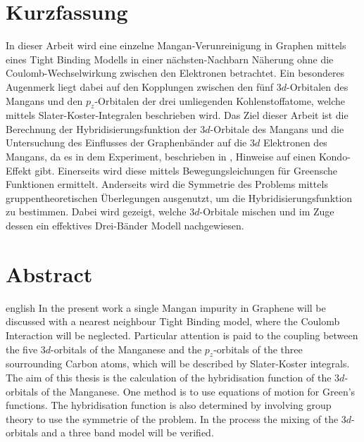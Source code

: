 \thispagestyle{plain}

\section*{Kurzfassung}
In dieser Arbeit wird eine einzelne Mangan-Verunreinigung in Graphen mittels eines Tight Binding Modells in einer nächsten-Nachbarn Näherung
ohne die Coulomb-Wechselwirkung zwischen den Elektronen betrachtet.
Ein besonderes Augenmerk liegt dabei auf den Kopplungen zwischen den fünf $3d$-Orbitalen des Mangans und den $p_z$-Orbitalen der drei umliegenden 
Kohlenstoffatome, welche mittels Slater-Koster-Integralen beschrieben wird.
Das Ziel dieser Arbeit ist die Berechnung der Hybridisierungsfunktion der $3d$-Orbitale des Mangans und die Untersuchung 
des Einflusses der Graphenbänder auf die $3d$ Elektronen des Mangans, da es in dem Experiment, beschrieben in \cite{doi:10.1021/acsnano.1c00139}, Hinweise auf einen Kondo-Effekt gibt. 
Einerseits wird diese mittels Bewegungsleichungen für Greensche Funktionen ermittelt.
Anderseits wird die Symmetrie des Problems mittels gruppentheoretischen Überlegungen ausgenutzt, um die Hybridisierungsfunktion zu bestimmen.
Dabei wird gezeigt, welche $3d$-Orbitale mischen und im Zuge dessen ein effektives Drei-Bänder Modell nachgewiesen.
\section*{Abstract}
\begin{foreignlanguage}{english}
In the present work a single Mangan impurity in Graphene will be discussed with a nearest neighbour Tight Binding model, where
the Coulomb Interaction will be neglected.
Particular attention is paid to the coupling between the five $3d$-orbitals of the Manganese and the $p_z$-orbitals of the three
sourrounding Carbon atoms, which will be described by Slater-Koster integrals.
The aim of this thesis is the calculation of the hybridisation function of the $3d$-orbitals of the Manganese.
One method is to use equations of motion for Green's functions. 
The hybridisation function is also determined by involving group theory to use the symmetrie of the problem.
In the process the mixing of the $3d$-orbitals and a three band model will be verified. 
\end{foreignlanguage}